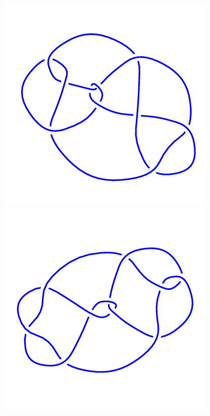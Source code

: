 \begin{figure}[H]
\begin{minipage}[b]{.18\linewidth}
	\end{minipage}
	\begin{minipage}[b]{.18\linewidth}
		\centering
		\includegraphics[width=\linewidth]{../data/10_69.png}
	\end{minipage}
	\begin{minipage}[b]{.18\linewidth}
		\centering
		\includegraphics[width=\linewidth]{../data/10_70.png}

\end{minipage}
\end{figure}
